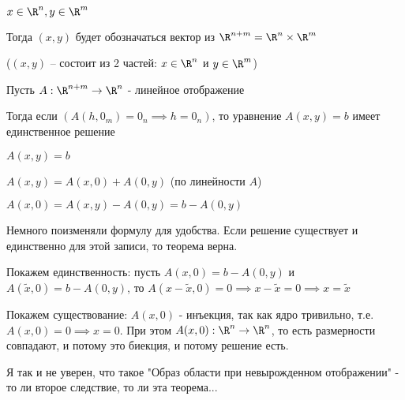     
    \begin{definition}

        $x \in \R^n, y \in \R^m$

        Тогда $(x,y)$ будет обозначаться вектор из $\R^{n+m} = \R^n \times \R^m$ 

        ($(x,y)$ -- состоит из 2 частей: $x \in \R^n$ и $y \in \R^m$)
    \end{definition}

    \begin{theorem} \thmslashn

        Пусть $A: \R^{n+m} \to \R^{n}$ - линейное отображение

        Тогда если $(A(h, 0_m) = 0_n \implies h = 0_n)$, то уравнение $A(x, y) = b$ имеет единственное решение

        $A(x,y) = b$

        $A(x,y) = A(x, 0) + A(0, y)$ (по линейности $A$)

        $A(x,0) = A(x,y) - A(0,y) = b - A(0, y)$

        Немного поизменяли формулу для удобства. Если решение существует и единственно для этой записи, то теорема верна.

        Покажем единственность: пусть $A(x, 0) = b - A(0, y)$ и $A(\tilde{x}, 0) = b - A(0, y)$, то $A(x - \tilde{x}, 0) = 0 \implies x - \tilde{x} = 0 \implies x = \tilde{x}$

        Покажем существование: $A(x, 0)$ - инъекция, так как ядро тривильно, т.е. $A(x, 0) = 0 \implies x = 0$. При этом $A(x, 0): \R^{n} \to \R^{n}$, то есть размерности совпадают, и потому это биекция, и потому решение есть.
    \end{theorem}

    Я так и не уверен, что такое "Образ области при невырожденном отображении" - то ли второе следствие, то ли эта теорема...
